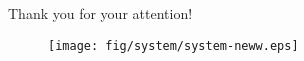 \documentclass{beamer}
\newcommand{\redc}[1]{{\color{red} #1}}
\newcommand{\bluec}[1]{{\color{blue} #1}}
\newcommand{\vect}[1]{\textbf{\textit{#1}}}
\begin{document}


\begin{frame}
  \vfill
  \centerline{ \Huge
    Thank you for your attention!  }
  \vfill
  \begin{figure}
    \centering 
    \texttt{[image: fig/system/system-neww.eps]}
  \end{figure}
  \vfill
\end{frame}
\end{document}
